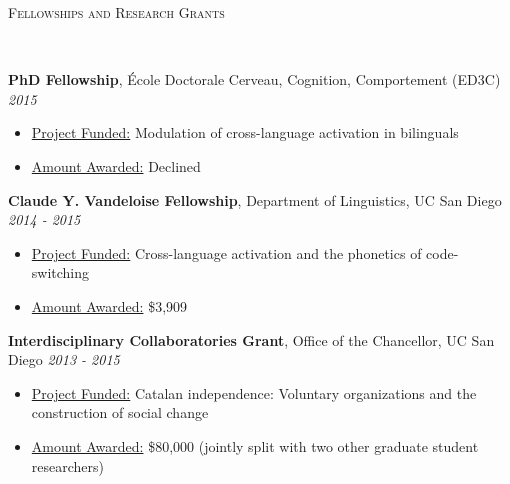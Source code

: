\documentclass[9pt]{article}
\newenvironment{changemargin}[2]{%
  \begin{list}{}{%
    \setlength{\topsep}{0pt}%
    \setlength{\leftmargin}{#1}%
    \setlength{\rightmargin}{#2}%
    \setlength{\listparindent}{\parindent}%
    \setlength{\itemindent}{\parindent}%
    \setlength{\parsep}{\parskip}%
  }%
  \item[]}{\end{list}
}
\newcommand{\lineover}{
	\begin{changemargin}{-0.05in}{-0.05in}
		\vspace*{-8pt}
		\hrulefill \\
		\vspace*{-2pt}
	\end{changemargin}
}
\newcommand{\header}[1]{
	\begin{changemargin}{-0.5in}{-0.5in}
		\scshape{#1}\\
  	\lineover
	\end{changemargin}
}
\newenvironment{body} {
	\vspace*{-16pt}
	\begin{changemargin}{-0.25in}{-0.5in}
  }	
	{\end{changemargin}
}
\begin{document}
\smallskip


\header{Fellowships and Research Grants}

\begin{body}
	\vspace{14pt}
	
		\textbf{PhD Fellowship}, \'Ecole Doctorale Cerveau, Cognition, Comportement (ED3C) \hfill {} \emph{2015}\\
	\vspace{-4pt}
	\begin{itemize}
		\item[]\underline{Project Funded:} Modulation of cross-language activation in bilinguals\\
		\item[]\underline{Amount Awarded:} Declined\\
	\end{itemize}
	\vspace{-4pt}
	\medskip
	
		\textbf{Claude Y. Vandeloise Fellowship}, Department of Linguistics, UC San Diego \hfill {} \emph{2014 - 2015}\\
	\vspace{-4pt}
	\begin{itemize}
		\item[]\underline{Project Funded:} Cross-language activation and the phonetics
of code-switching\\
		\item[]\underline{Amount Awarded:} \$3,909\\
	\end{itemize}
	\vspace{-4pt}
	\medskip
	
	\textbf{Interdisciplinary Collaboratories Grant}, Office of the Chancellor, UC San Diego \hfill {} \emph{2013 - 2015}\\
	\vspace{-4pt}
	\begin{itemize}
		\item[]\underline{Project Funded:} Catalan independence: Voluntary organizations and the construction of social change\\
		\item[]\underline{Amount Awarded:} \$80,000 (jointly split with two other graduate student researchers)\\
	\end{itemize}
	\vspace{-4pt}
	\medskip
		

\end{body}
\end{document}
